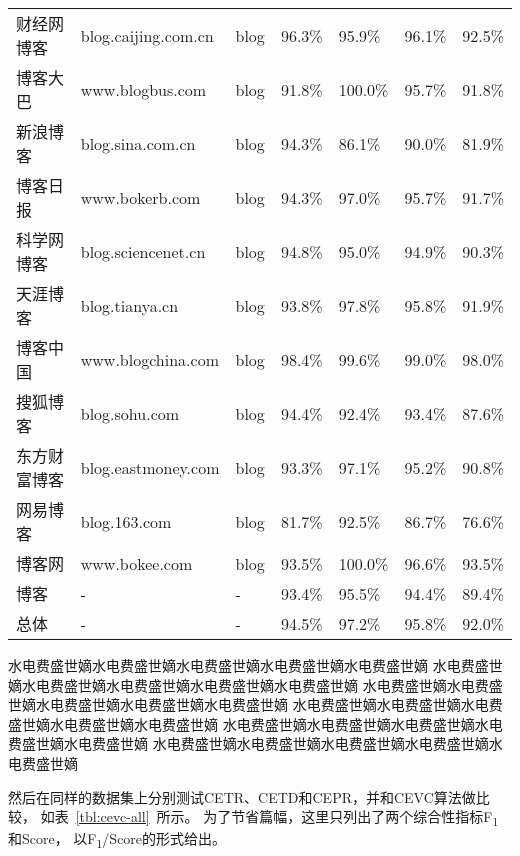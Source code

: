 \begin{table}[htbp]
\begin{tabular}{lllllll}
财经网博客 & blog.caijing.com.cn & blog & 96.3\% & 95.9\% & 96.1\% & 92.5\% \\
博客大巴 & www.blogbus.com & blog & 91.8\% & 100.0\% & 95.7\% & 91.8\% \\
新浪博客 & blog.sina.com.cn & blog & 94.3\% & 86.1\% & 90.0\% & 81.9\% \\
博客日报 & www.bokerb.com & blog & 94.3\% & 97.0\% & 95.7\% & 91.7\% \\
科学网博客 & blog.sciencenet.cn & blog & 94.8\% & 95.0\% & 94.9\% & 90.3\% \\
天涯博客 & blog.tianya.cn & blog & 93.8\% & 97.8\% & 95.8\% & 91.9\% \\
博客中国 & www.blogchina.com & blog & 98.4\% & 99.6\% & 99.0\% & 98.0\% \\
搜狐博客 & blog.sohu.com & blog & 94.4\% & 92.4\% & 93.4\% & 87.6\% \\
东方财富博客 & blog.eastmoney.com & blog & 93.3\% & 97.1\% & 95.2\% & 90.8\% \\
网易博客 & blog.163.com & blog & 81.7\% & 92.5\% & 86.7\% & 76.6\% \\
博客网 & www.bokee.com & blog & 93.5\% & 100.0\% & 96.6\% & 93.5\% \\
博客 & - & - & 93.4\% & 95.5\% & 94.4\% & 89.4\% \\
\hline
总体 & - & - & 94.5\% & 97.2\% & 95.8\% & 92.0\% \\
\bottomrule[1.5pt]
\end{tabular}
\end{table}

水电费盛世嫡水电费盛世嫡水电费盛世嫡水电费盛世嫡水电费盛世嫡
水电费盛世嫡水电费盛世嫡水电费盛世嫡水电费盛世嫡水电费盛世嫡
水电费盛世嫡水电费盛世嫡水电费盛世嫡水电费盛世嫡水电费盛世嫡
水电费盛世嫡水电费盛世嫡水电费盛世嫡水电费盛世嫡水电费盛世嫡
水电费盛世嫡水电费盛世嫡水电费盛世嫡水电费盛世嫡水电费盛世嫡
水电费盛世嫡水电费盛世嫡水电费盛世嫡水电费盛世嫡水电费盛世嫡

然后在同样的数据集上分别测试CETR、CETD和CEPR，并和CEVC算法做比较，
如表~\ref{tbl:cevc-all}~所示。
为了节省篇幅，这里只列出了两个综合性指标F\textsubscript{1}和Score，
以F\textsubscript{1}/Score的形式给出。

